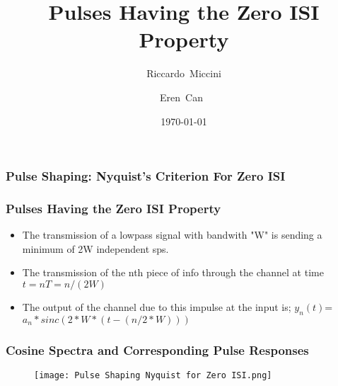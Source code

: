 \documentclass{beamer}
\title{Pulses Having the Zero ISI Property}
\subtitle{}
\author[Riccardo \and Eren]{Riccardo~Miccini\inst{1} \and Eren~Can~\inst{1}}
\institute[DTU]
{
	\inst{1}
	Technical University of Denmark\\
	Digital Communication
}
\date{\today}
\begin{document}
	\frame{\titlepage}
	\begin{frame}
		\frametitle{Pulse Shaping: Nyquist's Criterion For Zero ISI}
	\end{frame}
	\begin{frame}
		\frametitle{Pulses Having the Zero ISI Property}
		\begin{itemize}
			\item The transmission of a lowpass signal with bandwith "W" is sending a minimum of 2W independent sps.
			\item The transmission of the nth piece of info through the channel at time $t= nT=n/(2W)$
			\item The output of the channel due to this impulse at the input is; $y_n(t)$=$ a_n *sinc(2*W*(t-(n/2*W)))$
			\end{itemize}
			\end{frame}
			\begin{frame}
			\frametitle{Cosine Spectra and Corresponding Pulse Responses}
			\begin{figure}
			\texttt{[image: Pulse Shaping Nyquist for Zero ISI.png]}
			\end{figure}
			\end{frame}
	
\end{document}
